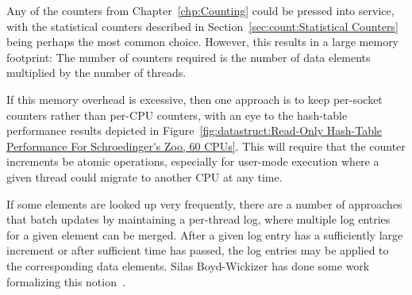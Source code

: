 Any of the counters from
Chapter~\ref{chp:Counting}
could be pressed into service, with the statistical counters described in
Section~\ref{sec:count:Statistical Counters}
being perhaps the most common choice.
However, this results in a large memory footprint: The number of counters
required is the number of data elements multiplied by the number of
threads.

If this memory overhead is excessive, then one approach is to keep
per-socket counters rather than per-CPU counters,
with an eye to the hash-table performance results depicted in
Figure~\ref{fig:datastruct:Read-Only Hash-Table Performance For Schroedinger's Zoo, 60 CPUs}.
This will require that the counter increments be atomic operations,
especially for user-mode execution where a given thread could migrate
to another CPU at any time.

If some elements are looked up very frequently, there are a number
of approaches that batch updates by maintaining a per-thread log,
where multiple log entries for a given element can be merged.
After a given log entry has a sufficiently large increment or after
sufficient time has passed, the log entries may be applied to the
corresponding data elements.
Silas Boyd-Wickizer has done some work formalizing this
notion~\cite{SilasBoydWickizerPhD}.
